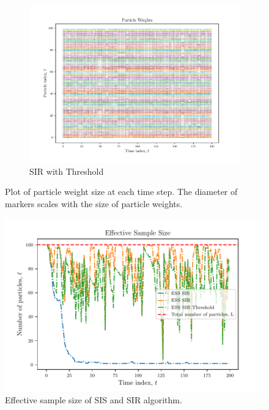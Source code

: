 \documentclass{article}
\begin{document}
\begin{figure}
    \centering
    \begin{subfigure}{.5\textwidth}
        \includegraphics[width=\textwidth]{Figures/particle_weights_sir_thres.pdf}
        \caption{SIR with Threshold}
        \label{fig:sir-thres-particle-weights}
    \end{subfigure}
    \caption{Plot of particle weight size at each time step. The diameter of markers scales with the size of particle weights.}
    \label{fig:particle-weights}
\end{figure}

\begin{figure}
    \centering
    \includegraphics[width=.5\textwidth]{Figures/ess.pdf}
    \caption{Effective sample size of SIS and SIR algorithm.}
    \label{fig:ess}
\end{figure}
\end{document}

